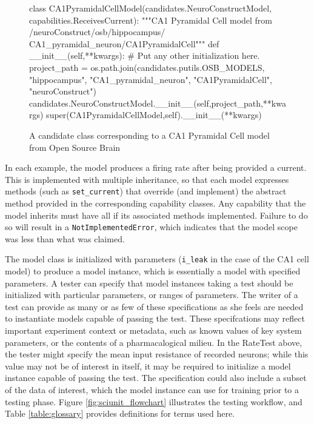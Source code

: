 \documentclass[11pt,letterpaper]{article}
\begin{document}
\begin{figure}
\caption{A candidate class corresponding to a CA1 Pyramidal Cell model from Open Source Brain}
\label{fig:ca1_model}
\begin{python}
class CA1PyramidalCellModel(candidates.NeuroConstructModel,
				            capabilities.ReceivesCurrent):
	"""CA1 Pyramidal Cell model from /neuroConstruct/osb/hippocampus/
	CA1_pyramidal_neuron/CA1PyramidalCell"""
	def __init__(self,**kwargs):
		# Put any other initialization here.
		project_path = os.path.join(candidates.putils.OSB_MODELS,
									"hippocampus",
									"CA1_pyramidal_neuron",
									"CA1PyramidalCell",
									"neuroConstruct")
		candidates.NeuroConstructModel.__init__(self,project_path,**kwargs)
		super(CA1PyramidalCellModel,self).__init__(**kwargs)
\end{python}
\end{figure}

In each example, the model produces a firing rate after being provided a current.  This is implemented with multiple inheritance, so that each model expresses methods (such as \verb|set_current|) that override (and implement) the abstract method provided in the corresponding capability classes.  Any capability that the model inherits must have all if its associated methods implemented.  Failure to do so will result in a \verb|NotImplementedError|, which indicates that the model scope was less than what was claimed.  

The model class is initialized with parameters (\verb|i_leak| in the case of the CA1 cell model) to produce a model instance, which is essentially a model with specified parameters.  A tester can specify that model instances taking a test should be initialized with particular parameters, or ranges of parameters. The writer of a test can provide as many or as few of these specifications as she feels are needed to instantiate models capable of passing the test.  These specifcations may reflect important experiment context or metadata, such as known values of key system parameters, or the contents of a pharmacalogical milieu.  In the RateTest above, the tester might specify the mean input resistance of recorded neurons; while this value may not be of interest in itself, it may be required to initialize a model instance capable of passing the test.  The specification could also include a subset of the data of interest, which the model instance can use for training prior to a testing phase.  Figure \ref{fig:sciunit_flowchart} illustrates the testing workflow, and Table \ref{table:glossary} provides definitions for terms used here.  
 
\end{document}
